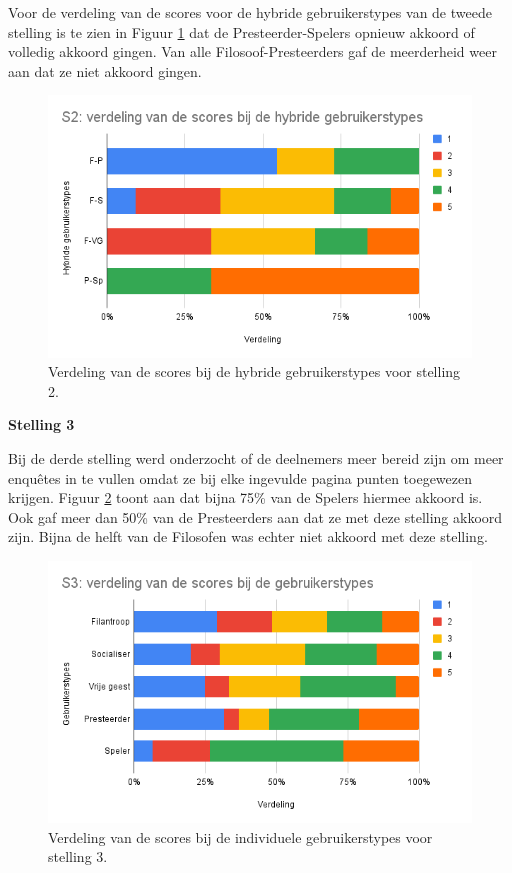 Voor de verdeling van de scores voor de hybride gebruikerstypes van de tweede stelling is te zien in Figuur \ref{fig:s2_hybride} dat de Presteerder-Spelers opnieuw akkoord of volledig akkoord gingen. Van alle Filosoof-Presteerders gaf de meerderheid weer aan dat ze niet akkoord gingen.

\begin{figure}
    \includegraphics[width=\linewidth]{S2_Hybride.png}
    \caption{Verdeling van de scores bij de hybride gebruikerstypes voor stelling 2.}
    \label{fig:s2_hybride}
\end{figure}


\textbf{Stelling 3}

Bij de derde stelling werd onderzocht of de deelnemers meer bereid zijn om meer enquêtes in te vullen omdat ze bij elke ingevulde pagina punten toegewezen krijgen. Figuur \ref{fig:s3} toont aan dat bijna 75\% van de Spelers hiermee akkoord is. Ook gaf meer dan 50\% van de Presteerders aan dat ze met deze stelling akkoord zijn. Bijna de helft van de Filosofen was echter niet akkoord met deze stelling.

\begin{figure}
    \includegraphics[width=\linewidth]{S3.png}
    \caption{Verdeling van de scores bij de individuele gebruikerstypes voor stelling 3.}
    \label{fig:s3}
\end{figure}

